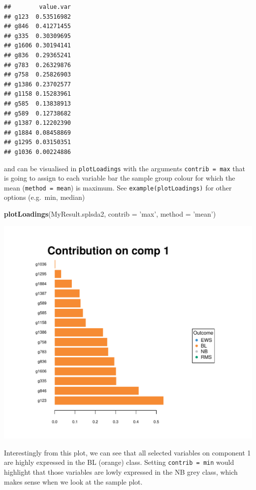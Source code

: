 \documentclass[]{book}
\newenvironment{Shaded}{\begin{snugshade}}{\end{snugshade}}
\newcommand{\DataTypeTok}[1]{\textcolor[rgb]{0.13,0.29,0.53}{#1}}
\newcommand{\DecValTok}[1]{\textcolor[rgb]{0.00,0.00,0.81}{#1}}
\newcommand{\KeywordTok}[1]{\textcolor[rgb]{0.13,0.29,0.53}{\textbf{#1}}}
\newcommand{\NormalTok}[1]{#1}
\newcommand{\OperatorTok}[1]{\textcolor[rgb]{0.81,0.36,0.00}{\textbf{#1}}}
\newcommand{\StringTok}[1]{\textcolor[rgb]{0.31,0.60,0.02}{#1}}
\begin{document}
\begin{Shaded}
\end{Shaded}

\begin{verbatim}
##        value.var
## g123  0.53516982
## g846  0.41271455
## g335  0.30309695
## g1606 0.30194141
## g836  0.29365241
## g783  0.26329876
## g758  0.25826903
## g1386 0.23702577
## g1158 0.15283961
## g585  0.13838913
## g589  0.12738682
## g1387 0.12202390
## g1884 0.08458869
## g1295 0.03150351
## g1036 0.00224886
\end{verbatim}

and can be visualised in \texttt{plotLoadings} with the arguments \texttt{contrib\ =\ \textquotesingle{}max\textquotesingle{}} that is going to assign to each variable bar the sample group colour for which the mean (\texttt{method\ =\ \textquotesingle{}mean\textquotesingle{}}) is maximum. See \texttt{example(plotLoadings)} for other options (e.g.~min, median)

\begin{Shaded}
\begin{Highlighting}[]
\KeywordTok{plotLoadings}\NormalTok{(MyResult.splsda2, }\DataTypeTok{contrib =} \StringTok{'max'}\NormalTok{, }\DataTypeTok{method =} \StringTok{'mean'}\NormalTok{)}
\end{Highlighting}
\end{Shaded}

\begin{center}\includegraphics[width=0.5\linewidth]{Figures/04-splsda-plotLoadings-1} \end{center}

Interestingly from this plot, we can see that all selected variables on component 1 are highly expressed in the BL (orange) class. Setting \texttt{contrib\ =\ \textquotesingle{}min\textquotesingle{}} would highlight that those variables are lowly expressed in the NB grey class, which makes sense when we look at the sample plot.
\end{document}

